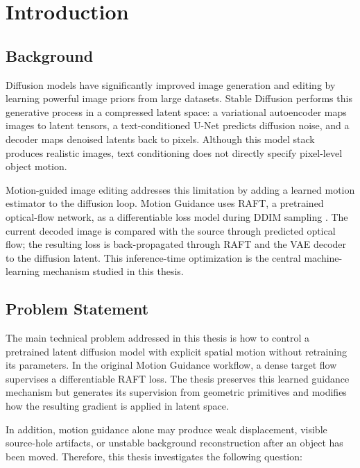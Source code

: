 \setlength{\footskip}{8mm}

\chapter{Introduction}
\label{ch:introduction}

\section{Background}

Diffusion models have significantly improved image generation and editing by learning powerful image priors from large datasets. Stable Diffusion performs this generative process in a compressed latent space: a variational autoencoder maps images to latent tensors, a text-conditioned U-Net predicts diffusion noise, and a decoder maps denoised latents back to pixels. Although this model stack produces realistic images, text conditioning does not directly specify pixel-level object motion.

Motion-guided image editing addresses this limitation by adding a learned motion estimator to the diffusion loop. Motion Guidance uses RAFT, a pretrained optical-flow network, as a differentiable loss model during DDIM sampling \cite{geng2024motionguidance,teed2020raft}. The current decoded image is compared with the source through predicted optical flow; the resulting loss is back-propagated through RAFT and the VAE decoder to the diffusion latent. This inference-time optimization is the central machine-learning mechanism studied in this thesis.

\section{Problem Statement}

The main technical problem addressed in this thesis is how to control a pretrained latent diffusion model with explicit spatial motion without retraining its parameters. In the original Motion Guidance workflow, a dense target flow supervises a differentiable RAFT loss. The thesis preserves this learned guidance mechanism but generates its supervision from geometric primitives and modifies how the resulting gradient is applied in latent space.

In addition, motion guidance alone may produce weak displacement, visible source-hole artifacts, or unstable background reconstruction after an object has been moved. Therefore, this thesis investigates the following question:

